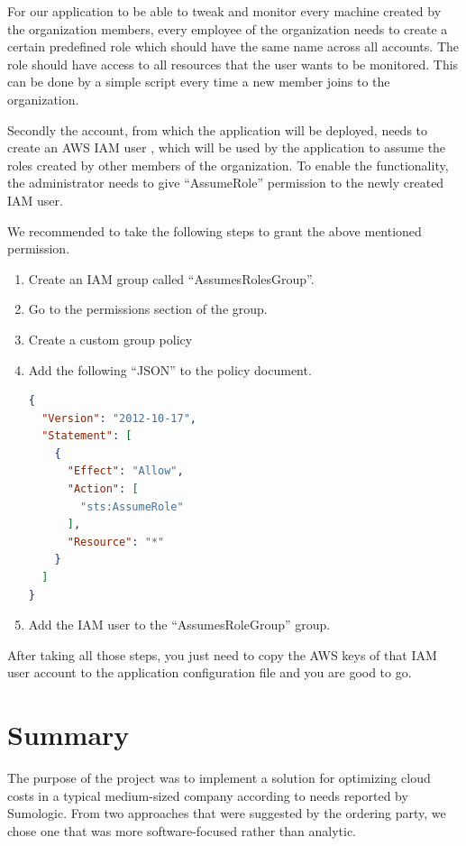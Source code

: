 \documentclass[licencjacka,en]{thesisclass}
\begin{document}
For our application to be able to tweak and monitor every machine created by the organization members, every employee of the organization needs to create a certain predefined role which should have the same name across all accounts. The role should have access to all resources that the user wants to be monitored. This can be done by a simple script every time a new member joins to the organization.

Secondly the account, from which the application will be deployed, needs to create an AWS IAM user \cite{AWSIAM}, which will be used by the application to assume the roles created by other members of the organization. To enable the functionality, the administrator needs to give “AssumeRole” permission to the newly created IAM user.

We recommended to take the following steps to grant the above mentioned permission.



\begin{enumerate}

\item Create an IAM group called “AssumesRolesGroup”.
\item Go to the permissions section of the group.
\item Create a custom group policy
\item Add the following “JSON” to the policy document.

\begin{lstlisting}[language=json,firstnumber=1]
{
  "Version": "2012-10-17",
  "Statement": [
    {
      "Effect": "Allow",
      "Action": [
        "sts:AssumeRole"
      ],
      "Resource": "*"
    }
  ]
}
\end{lstlisting}

\item Add the IAM user to the “AssumesRoleGroup” group.
\end{enumerate}

After taking all those steps, you just need to copy the AWS keys of that IAM user account to the application configuration file and you are good to go.


    \chapter{Summary}
    The purpose of the project was to implement a solution for optimizing cloud costs
    in a typical medium-sized company according to needs reported by Sumologic.
    From two approaches that were suggested by the ordering party,
    we chose one that was more software-focused rather than analytic.
\end{document}

